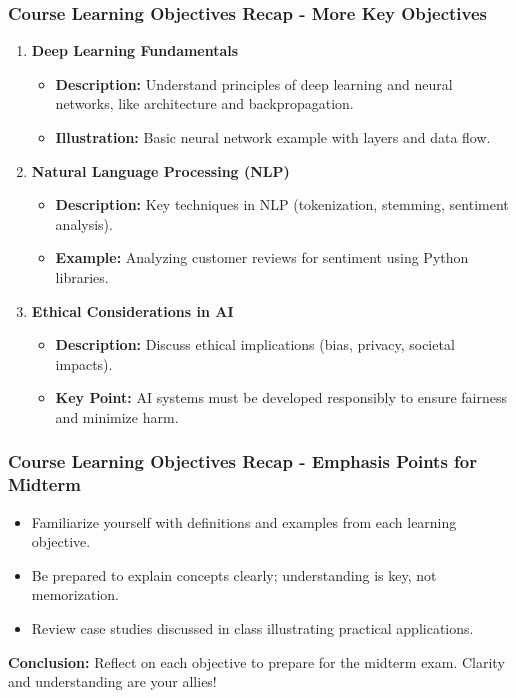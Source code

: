 \documentclass{beamer}
\begin{document}
\begin{frame}[fragile]
    \frametitle{Course Learning Objectives Recap - More Key Objectives}
    \begin{enumerate}[resume]
        \item \textbf{Deep Learning Fundamentals}
        \begin{itemize}
            \item \textbf{Description:} Understand principles of deep learning and neural networks, like architecture and backpropagation.
            \item \textbf{Illustration:} Basic neural network example with layers and data flow.
        \end{itemize}
        
        \item \textbf{Natural Language Processing (NLP)}
        \begin{itemize}
            \item \textbf{Description:} Key techniques in NLP (tokenization, stemming, sentiment analysis).
            \item \textbf{Example:} Analyzing customer reviews for sentiment using Python libraries.
        \end{itemize}
        
        \item \textbf{Ethical Considerations in AI}
        \begin{itemize}
            \item \textbf{Description:} Discuss ethical implications (bias, privacy, societal impacts).
            \item \textbf{Key Point:} AI systems must be developed responsibly to ensure fairness and minimize harm.
        \end{itemize}
    \end{enumerate}
\end{frame}

\begin{frame}[fragile]
    \frametitle{Course Learning Objectives Recap - Emphasis Points for Midterm}
    \begin{itemize}
        \item Familiarize yourself with definitions and examples from each learning objective.
        \item Be prepared to explain concepts clearly; understanding is key, not memorization.
        \item Review case studies discussed in class illustrating practical applications.
    \end{itemize}
    \vspace{1em}
    \textbf{Conclusion:} Reflect on each objective to prepare for the midterm exam. Clarity and understanding are your allies!
\end{frame}
\end{document}
